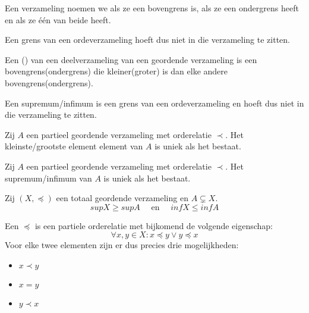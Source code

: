 \documentclass[main.tex]{subfiles}
\begin{document}
\begin{de}
  Een verzameling noemen we  als ze een bovengrens is,  als ze een ondergrens heeft en  als ze \'e\'en van beide heeft.
\end{de}

\begin{opm}
  Een grens van een ordeverzameling hoeft dus niet in die verzameling te zitten.
\end{opm}

\begin{de}
  Een () van een deelverzameling van een geordende verzameling is een bovengrens(ondergrens) die kleiner(groter) is dan elke andere bovengrens(ondergrens).
\end{de}

\begin{opm}
  Een supremum/infimum is een grens van een ordeverzameling en hoeft dus niet in die verzameling te zitten.
\end{opm}

\begin{st}
  Zij $A$ een partieel geordende verzameling met orderelatie $\prec$.
  Het kleinste/grootste element element van $A$ is uniek als het bestaat.
\end{st}

\begin{st}
  Zij $A$ een partieel geordende verzameling met orderelatie $\prec$.
  Het supremum/infimum van $A$ is uniek als het bestaat.
\end{st}

\begin{st}
  \label{st:deelverzameling-kleiner-supremum}
  Zij $(X,\preceq)$ een totaal geordende verzameling en $A \subsetneq X$.
  \[ sup X \ge sup A \quad\text{ en }\quad inf X \le inf A \]
\end{st}

\begin{de}
  Een  $\preceq$ is een partiele orderelatie met bijkomend de volgende eigenschap:
  \[ \forall x,y \in X: x \preceq y \vee y \preceq x \]
  Voor elke twee elementen zijn er dus precies drie mogelijkheden:
  \begin{itemize}
  \item $x \prec y$
  \item $x = y$
  \item $y \prec x$
  \end{itemize}
\end{de}
\end{document}
